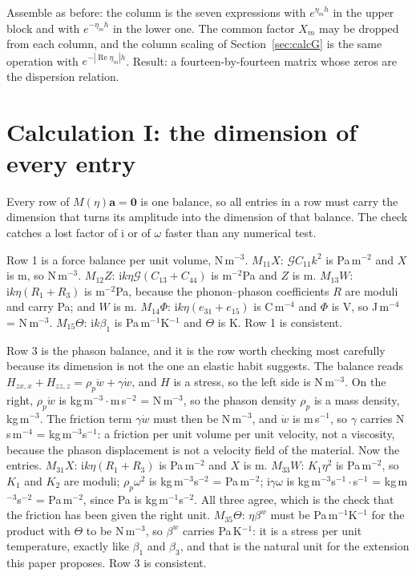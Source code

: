 \documentclass[11pt]{article}
\makeatletter
\newif\ifshowworked
\newenvironment{worked}{%
  \ifshowworked\par\smallskip\noindent\textit{Working.}\par\smallskip\else
  \setbox\z@\vbox\bgroup\fi}{\ifshowworked\par\smallskip\else\egroup\fi}
\newcommand{\ii}{\mathrm{i}}
\newcommand{\Gcal}{\mathcal{G}}
\makeatother
\begin{document}
\begin{worked}
Assemble as before: the column is the seven expressions with $e^{\eta_mh}$ in the upper block and with
$e^{-\eta_mh}$ in the lower one. The common factor $X_m$ may be dropped from each column, and the column
scaling of Section~\ref{sec:calcG} is the same operation with $e^{-|\operatorname{Re}\eta_m|h}$. Result: a
fourteen-by-fourteen matrix whose zeros are the dispersion relation.
\end{worked}

\section{Calculation I: the dimension of every entry}

Every row of $M(\eta)\mathbf a=\mathbf 0$ is one balance, so all entries in a row must carry the dimension
that turns its amplitude into the dimension of that balance. The check catches a lost factor of $\ii$ or of
$\omega$ faster than any numerical test.

\begin{worked}
Row 1 is a force balance per unit volume, N\,m$^{-3}$. $M_{11}X$: $\Gcal C_{11}k^2$ is Pa\,m$^{-2}$ and $X$
is m, so N\,m$^{-3}$. $M_{12}Z$: $\ii k\eta\Gcal(C_{13}+C_{44})$ is m$^{-2}$Pa and $Z$ is m.
$M_{13}W$: $\ii k\eta(R_1+R_3)$ is m$^{-2}$Pa, because the phonon--phason coefficients $R$ are moduli and
carry Pa; and $W$ is m. $M_{14}\Phi$: $\ii k\eta(e_{31}+e_{15})$ is C\,m$^{-4}$ and $\Phi$ is V, so
J\,m$^{-4}$ = N\,m$^{-3}$. $M_{15}\Theta$: $\ii k\beta_1$ is Pa\,m$^{-1}$K$^{-1}$ and $\Theta$ is K. Row 1
is consistent.
\end{worked}

\begin{worked}
Row 3 is the phason balance, and it is the row worth checking most carefully because its dimension is not
the one an elastic habit suggests. The balance reads
$H_{zx,x}+H_{zz,z}=\rho_p\ddot w+\gamma\dot w$, and $H$ is a stress, so the left side is N\,m$^{-3}$. On
the right, $\rho_p\ddot w$ is kg\,m$^{-3}\cdot$m\,s$^{-2}$ = N\,m$^{-3}$, so the phason density $\rho_p$ is
a mass density, kg\,m$^{-3}$. The friction term $\gamma\dot w$ must then be N\,m$^{-3}$, and $\dot w$ is
m\,s$^{-1}$, so $\gamma$ carries N\,s\,m$^{-4}$ = kg\,m$^{-3}$s$^{-1}$: a friction per unit volume per unit
velocity, not a viscosity, because the phason displacement is not a velocity field of the material.
Now the entries. $M_{31}X$: $\ii k\eta(R_1+R_3)$ is Pa\,m$^{-2}$ and $X$ is m.
$M_{33}W$: $K_1\eta^2$ is Pa\,m$^{-2}$, so $K_1$ and $K_2$ are moduli; $\rho_p\omega^2$ is
kg\,m$^{-3}$s$^{-2}$ = Pa\,m$^{-2}$; $\ii\gamma\omega$ is kg\,m$^{-3}$s$^{-1}\cdot$s$^{-1}$ = kg\,m$^{-3}$s$^{-2}$ = Pa\,m$^{-2}$,
since Pa is kg\,m$^{-1}$s$^{-2}$. All three agree, which is the check that the friction has been given the right unit.
$M_{35}\Theta$: $\eta\beta^{w}$ must be Pa\,m$^{-1}$K$^{-1}$ for the product with $\Theta$ to be
N\,m$^{-3}$, so $\beta^{w}$ carries Pa\,K$^{-1}$: it is a stress per unit temperature, exactly like
$\beta_1$ and $\beta_3$, and that is the natural unit for the extension this paper proposes. Row 3 is
consistent.
\end{worked}
\end{document}
